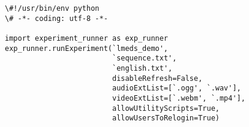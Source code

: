 \begin{tcolorbox}[colback=white,colframe=blue,width=\dimexpr\textwidth+12mm\relax,enlarge left by=-6mm,enlarge right by=6mm]

\begin{lstlisting}
\#!/usr/bin/env python
\# -*- coding: utf-8 -*-

import experiment_runner as exp_runner
exp_runner.runExperiment(`lmeds_demo',
                         `sequence.txt',
                         `english.txt',
                         disableRefresh=False,
                         audioExtList=[`.ogg', `.wav'],
                         videoExtList=[`.webm', `.mp4'],
                         allowUtilityScripts=True,
                         allowUsersToRelogin=True)
\end{lstlisting}
\end{tcolorbox}
